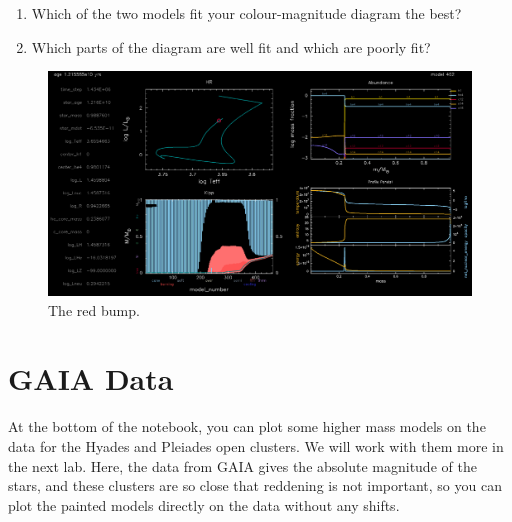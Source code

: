 \documentclass{article}
\begin{document}
\begin{enumerate}
\begin{enumerate}
    In the models, this is a loop up and down the giant branch, so the model line will look thicker here.  The burning region of stars in the red bump has just reached the bottom of the outer convective zone, bringing fresh fuel to the fusion region. This actually makes the stars fainter for a bit, but once the burning zone is connected convectively to the surface the stars get brighter quickly, so the observed colour-magnitude diagram thins out. (See Fig.~\ref{fig:bump})
    
    \item \textbf{Red Clump}: Not all clusters have a ``red clump'' which is the region just redward of the giant branch.  Some have a large horizontal group of stars reaching blueward called ``the horizonal branch.''  Stars in the red clump or the horizontal branch are fusing helium in their cores.  What does your cluster have?  The bump of your cluster might be brighter or fainter than the red clump.  Is yours brighter or fainter?  
    
    In the models this part of the evolution looks like a bunch of loops.
\end{enumerate}
    \item Which of the two models fit your colour-magnitude diagram the best?  
    \item Which parts of the diagram are well fit and which are poorly fit?
\end{enumerate}
\begin{figure}[h]
\centering
\includegraphics[width=\textwidth]{latex/grid1000462.png}
\caption{The red bump.}
\label{fig:bump}
\end{figure}

\section{GAIA Data}

At the bottom of the notebook, you can plot some higher mass models on the data for the Hyades and Pleiades open clusters.  We will work with them more in the next lab. Here, the data from GAIA gives the absolute magnitude of the stars, and these clusters are so close that reddening is not important, so you can plot the painted models directly on the data without any shifts.
\end{document}
